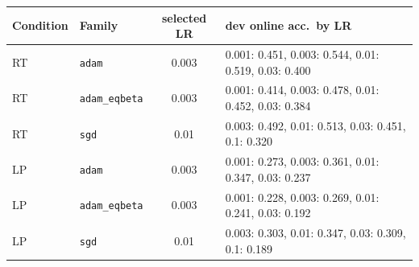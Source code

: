 \begin{tabular}{llcl}
\toprule
Condition & Family & selected LR & dev online acc.\ by LR \\
\midrule
RT & \texttt{adam} & 0.003 & 0.001: 0.451, 0.003: 0.544, 0.01: 0.519, 0.03: 0.400 \\
RT & \texttt{adam\_eqbeta} & 0.003 & 0.001: 0.414, 0.003: 0.478, 0.01: 0.452, 0.03: 0.384 \\
RT & \texttt{sgd} & 0.01 & 0.003: 0.492, 0.01: 0.513, 0.03: 0.451, 0.1: 0.320 \\
LP & \texttt{adam} & 0.003 & 0.001: 0.273, 0.003: 0.361, 0.01: 0.347, 0.03: 0.237 \\
LP & \texttt{adam\_eqbeta} & 0.003 & 0.001: 0.228, 0.003: 0.269, 0.01: 0.241, 0.03: 0.192 \\
LP & \texttt{sgd} & 0.01 & 0.003: 0.303, 0.01: 0.347, 0.03: 0.309, 0.1: 0.189 \\
\bottomrule
\end{tabular}
